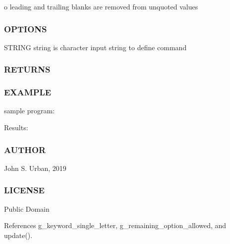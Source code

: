 o leading and trailing blanks are removed from unquoted values

\subsubsection*{O\+P\+T\+I\+O\+NS}

S\+T\+R\+I\+NG string is character input string to define command

\subsubsection*{R\+E\+T\+U\+R\+NS}

\subsubsection*{E\+X\+A\+M\+P\+LE}

sample program\+: \begin{DoxyVerb}Results:
\end{DoxyVerb}


\subsubsection*{A\+U\+T\+H\+OR}

John S. Urban, 2019 \subsubsection*{L\+I\+C\+E\+N\+SE}

Public Domain 

References g\+\_\+keyword\+\_\+single\+\_\+letter, g\+\_\+remaining\+\_\+option\+\_\+allowed, and update().

